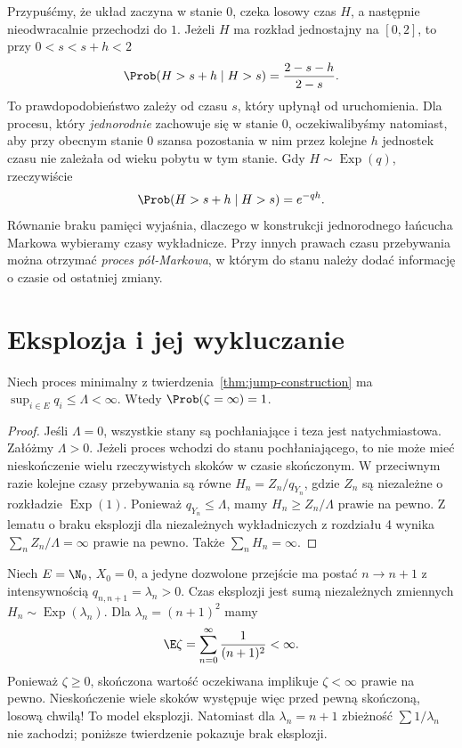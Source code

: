 \begin{przyklad}
Przypuśćmy, że układ zaczyna w stanie $0$, czeka losowy
czas $H$, a następnie nieodwracalnie przechodzi do $1$.
Jeżeli $H$ ma rozkład jednostajny na $[0,2]$, to przy $0<s<s+h<2$
\[
\Prob(H>s+h\mid H>s)=\frac{2-s-h}{2-s}.
\]
To prawdopodobieństwo zależy od czasu $s$, który upłynął
od uruchomienia. Dla procesu, który \emph{jednorodnie}
zachowuje się w stanie $0$, oczekiwalibyśmy natomiast,
aby przy obecnym stanie $0$ szansa pozostania w nim przez
kolejne $h$ jednostek czasu nie zależała od wieku pobytu
w tym stanie. Gdy $H\sim\operatorname{Exp}(q)$, rzeczywiście
\[
\Prob(H>s+h\mid H>s)=e^{-qh}.
\]
Równanie braku pamięci wyjaśnia, dlaczego w konstrukcji
jednorodnego łańcucha Markowa wybieramy czasy wykładnicze.
Przy innych prawach czasu przebywania można otrzymać
\emph{proces pół-Markowa}, w którym do stanu należy
dodać informację o czasie od ostatniej zmiany.
\end{przyklad}

\section{Eksplozja i jej wykluczanie}
\begin{twierdzenie}
\label{thm:bounded-rates}
Niech proces minimalny z twierdzenia~\ref{thm:jump-construction}
ma $\sup_{i\in E}q_i\le\Lambda<\infty$.
Wtedy $\Prob(\zeta=\infty)=1$.
\end{twierdzenie}
\begin{proof}
Jeśli $\Lambda=0$, wszystkie stany są pochłaniające
i teza jest natychmiastowa. Załóżmy $\Lambda>0$.
Jeżeli proces wchodzi do stanu pochłaniającego, to
nie może mieć nieskończenie wielu rzeczywistych skoków
w czasie skończonym. W przeciwnym razie kolejne czasy
przebywania są równe $H_n=Z_n/q_{Y_n}$, gdzie
$Z_n$ są niezależne o rozkładzie $\operatorname{Exp}(1)$.
Ponieważ $q_{Y_n}\le\Lambda$, mamy
$H_n\ge Z_n/\Lambda$ prawie na pewno.
Z lematu o braku eksplozji dla niezależnych wykładniczych
z rozdziału 4 wynika $\sum_n Z_n/\Lambda=\infty$
prawie na pewno. Także $\sum_n H_n=\infty$.
\end{proof}

\begin{przyklad}
Niech $E=\N_0$, $X_0=0$, a jedyne dozwolone przejście ma postać
$n\to n+1$ z intensywnością $q_{n,n+1}=\lambda_n>0$.
Czas eksplozji jest sumą niezależnych zmiennych
$H_n\sim\operatorname{Exp}(\lambda_n)$.
Dla $\lambda_n=(n+1)^2$ mamy
\[
\E\zeta=\sum_{n=0}^\infty\frac1{(n+1)^2}<\infty.
\]
Ponieważ $\zeta\ge0$, skończona wartość oczekiwana
implikuje $\zeta<\infty$ prawie na pewno.
Nieskończenie wiele skoków występuje więc przed pewną
skończoną, losową chwilą! To model eksplozji.
Natomiast dla $\lambda_n=n+1$ zbieżność $\sum1/\lambda_n$
nie zachodzi; poniższe twierdzenie pokazuje brak eksplozji.
\end{przyklad}

